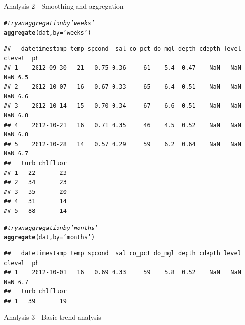 \documentclass[xcolor=svgnames]{beamer}\usepackage[]{graphicx}\usepackage[]{color}
\makeatletter
\newcommand{\hlstr}[1]{\textcolor[rgb]{0.192,0.494,0.8}{#1}}%
\newcommand{\hlcom}[1]{\textcolor[rgb]{0.678,0.584,0.686}{\textit{#1}}}%
\newcommand{\hlstd}[1]{\textcolor[rgb]{0.345,0.345,0.345}{#1}}%
\newcommand{\hlkwc}[1]{\textcolor[rgb]{0.333,0.667,0.333}{#1}}%
\newcommand{\hlkwd}[1]{\textcolor[rgb]{0.737,0.353,0.396}{\textbf{#1}}}%
\newenvironment{kframe}{%
 \def\at@end@of@kframe{}%
 \ifinner\ifhmode%
  \def\at@end@of@kframe{\end{minipage}}%
  \begin{minipage}{\columnwidth}%
 \fi\fi%
 \def\FrameCommand##1{\hskip\@totalleftmargin \hskip-\fboxsep
 \colorbox{shadecolor}{##1}\hskip-\fboxsep
     \hskip-\linewidth \hskip-\@totalleftmargin \hskip\columnwidth}%
 \MakeFramed {\advance\hsize-\width
   \@totalleftmargin\z@ \linewidth\hsize
   \@setminipage}}%
 {\par\unskip\endMakeFramed%
 \at@end@of@kframe}
\newenvironment{knitrout}{}{} %
\newcommand{\Bigtxt}[1]{\textbf{\textit{#1}}}
\makeatother
\begin{document}
\begin{frame}[containsverbatim]{Analysis 2 - Smoothing and aggregation}
\begin{knitrout}\scriptsize
{}\color{fgcolor}\begin{kframe}
\begin{alltt}
\hlcom{# try an aggregation by 'weeks'}
\hlkwd{aggregate}\hlstd{(dat,} \hlkwc{by} \hlstd{=} \hlstr{'weeks'}\hlstd{)}
\end{alltt}
\begin{verbatim}
##   datetimestamp temp spcond  sal do_pct do_mgl depth cdepth level clevel  ph
## 1    2012-09-30   21   0.75 0.36     61    5.4  0.47    NaN   NaN    NaN 6.5
## 2    2012-10-07   16   0.67 0.33     65    6.4  0.51    NaN   NaN    NaN 6.6
## 3    2012-10-14   15   0.70 0.34     67    6.6  0.51    NaN   NaN    NaN 6.8
## 4    2012-10-21   16   0.71 0.35     46    4.5  0.52    NaN   NaN    NaN 6.8
## 5    2012-10-28   14   0.57 0.29     59    6.2  0.64    NaN   NaN    NaN 6.7
##   turb chlfluor
## 1   22       23
## 2   34       23
## 3   35       20
## 4   31       14
## 5   88       14
\end{verbatim}
\begin{alltt}
\hlcom{# try an aggregation by 'months'}
\hlkwd{aggregate}\hlstd{(dat,} \hlkwc{by} \hlstd{=} \hlstr{'months'}\hlstd{)}
\end{alltt}
\begin{verbatim}
##   datetimestamp temp spcond  sal do_pct do_mgl depth cdepth level clevel  ph
## 1    2012-10-01   16   0.69 0.33     59    5.8  0.52    NaN   NaN    NaN 6.7
##   turb chlfluor
## 1   39       19
\end{verbatim}
\end{kframe}
\end{knitrout}
\end{frame}

\begin{frame}[containsverbatim]{Analysis 3 - Basic trend analysis}

\end{frame}

\end{document}
